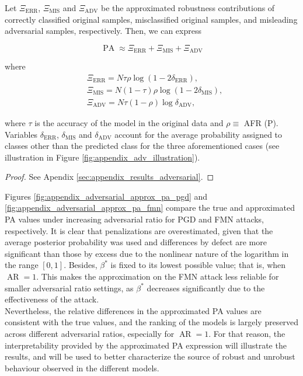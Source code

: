 \begin{theorem}
    Let $\Xi_{\text{ERR}}$, $\Xi_{\text{MIS}}$ and $\Xi_{\text{ADV}}$ be the approximated robustness
    contributions of correctly classified original samples, misclassified original samples,
    and misleading adversarial samples, respectively. Then, we can express

    $$
    \operatorname{PA} \approx \Xi_{\text{ERR}} + \Xi_{\text{MIS}} + \Xi_{\text{ADV}}
    $$

    where
    $$
    \begin{aligned}
        &\Xi_{\text{ERR}} = N \tau \rho \log \left( 1 - 2\delta_{\text{ERR}} \right), \\
        &\Xi_{\text{MIS}} = N (1- \tau) \rho \log \left( 1 - 2\delta_{\text{MIS}} \right), \\
        &\Xi_{\text{ADV}} = N \tau (1 - \rho) \log \delta_{\text{ADV}},
    \end{aligned}
    $$

    where $\tau$ is the accuracy of the model in the original data and $\rho \equiv$ AFR (P).
    Variables $\delta_{\text{ERR}}$, $\delta_{\text{MIS}}$ and $\delta_{\text{ADV}}$ account for the 
    average probability assigned to
    classes other than the predicted class for the three aforementioned cases 
    (see illustration in Figure \ref{fig:appendix_adv_illustration}).
    \label{thm:approximated_pa}
\end{theorem}
\begin{proof}
    See Apendix \ref{sec:appendix_results_adversarial}.
\end{proof}

Figures \ref{fig:appendix_adversarial_approx_pa_pgd} and \ref{fig:appendix_adversarial_approx_pa_fmn}
compare the true and approximated PA values under increasing adversarial ratio for
PGD and FMN attacks, respectively. It is clear that penalizations are overestimated, 
given that the average posterior probability was
used and differences by defect are more significant than those by excess due to
the nonlinear nature of the logarithm in the range $[0,1]$.
Besides, $\beta^{*}$ is fixed to its lowest possible value; that
is, when $\operatorname{AR} = 1$. This makes the approximation on the FMN attack less
reliable for smaller adversarial ratio settings, as $\beta^{*}$ decreases significantly
due to the effectiveness of the attack. \\

Nevertheless, the relative differences in the approximated PA values are consistent
with the true values, and the ranking of the models is largely preserved across different
adversarial ratios, especially for $\operatorname{AR} = 1$. For that reason, the
interpretability provided by the approximated PA expression will illustrate
the results, and will be used to better characterize the source of robust and unrobust behaviour
observed in the different models. \\


